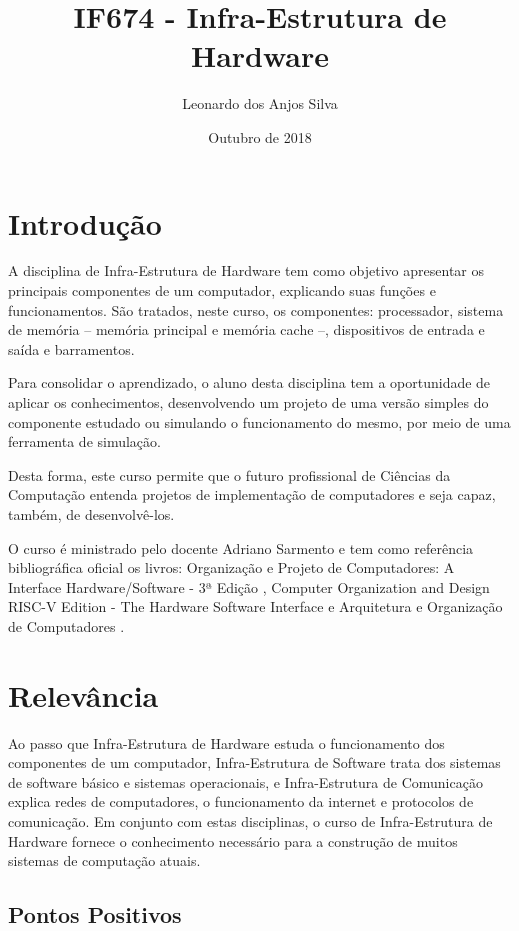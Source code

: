 \documentclass[10pt]{article}
\title{IF674 - Infra-Estrutura de Hardware}
\author{Leonardo dos Anjos Silva}
\date{Outubro de 2018}
\begin{document}
\maketitle

\section{Introdução}

A disciplina de Infra-Estrutura de Hardware tem como objetivo apresentar os principais componentes de um computador, explicando suas funções e funcionamentos. São tratados, neste curso, os componentes: processador, sistema de memória -- memória principal e memória cache --, dispositivos de entrada e saída e barramentos.

Para consolidar o aprendizado, o aluno desta disciplina tem a oportunidade de aplicar os conhecimentos, desenvolvendo um projeto de uma versão simples do componente estudado ou simulando o funcionamento do mesmo, por meio de uma ferramenta de simulação.

Desta forma, este curso permite que o futuro profissional de Ciências da Computação entenda projetos de implementação de computadores e seja capaz, também, de desenvolvê-los.

O curso é ministrado pelo docente Adriano Sarmento e tem como referência bibliográfica oficial os livros: Organização e Projeto de Computadores: A Interface Hardware/Software - 3ª Edição \cite{firstBookPortuguese}, Computer Organization and Design RISC-V Edition - The Hardware Software Interface \cite{firstBookEnglish}  e Arquitetura e Organização de Computadores \cite{secondBook}.

\section{Relevância}

Ao passo que Infra-Estrutura de Hardware estuda o funcionamento dos componentes de um computador, Infra-Estrutura de Software trata dos sistemas de software básico e sistemas operacionais, e Infra-Estrutura de Comunicação explica redes de computadores, o funcionamento da internet e protocolos de comunicação. Em conjunto com estas disciplinas, o curso de Infra-Estrutura de Hardware fornece o conhecimento necessário para a construção de muitos sistemas de computação atuais.

\subsection{Pontos Positivos}
\end{document}
